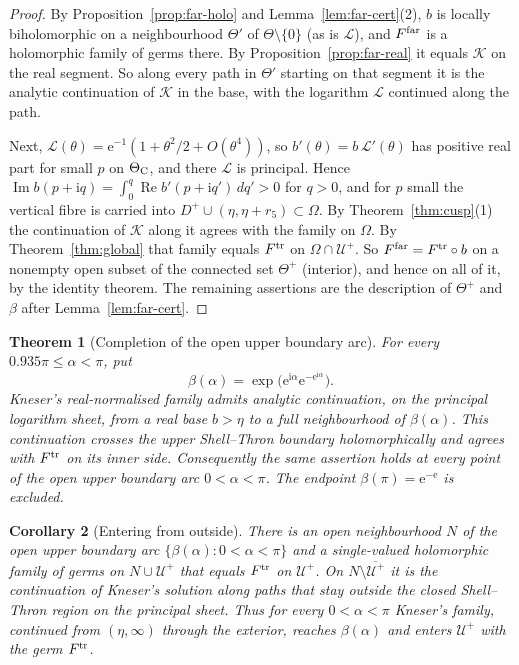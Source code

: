 \documentclass[11pt]{amsart}
\newtheorem{theorem}{Theorem}[section]
\newtheorem{corollary}[theorem]{Corollary}
\theoremstyle{definition}
\newcommand{\eee}{\mathrm{e}}
\newcommand{\ii}{\mathrm{i}}
\begin{document}
\begin{proof}
By Proposition~\ref{prop:far-holo} and Lemma~\ref{lem:far-cert}(2), $b$ is locally
biholomorphic on a neighbourhood $\Theta'$ of $\Theta\setminus\{0\}$ (as is $\mathcal L$), and $F^{\rm far}$ is a
holomorphic family of germs there.  By Proposition~\ref{prop:far-real} it equals $\mathcal K$ on
the real segment.  So along every path in $\Theta'$ starting on that segment it is the
analytic continuation of $\mathcal K$ in the base, with the logarithm $\mathcal L$ continued along
the path.

Next, $\mathcal L(\theta)=\eee^{-1}(1+\theta^2/2+O(\theta^4))$, so $b'(\theta)=b\,\mathcal L'(\theta)$ has positive real part for
small $p$ on $\Theta_{\rm C}$, and there $\mathcal L$ is principal.  Hence $\operatorname{Im}b(p+\ii q)=\int_0^q\operatorname{Re}b'(p+\ii q')\,dq'>0$ for $q>0$, and for $p$
small the vertical fibre is carried into $D^+\cup(\eta,\eta+r_5)\subset\Omega$.  By
Theorem~\ref{thm:cusp}(1) the continuation of $\mathcal K$ along it agrees with the family
on $\Omega$.  By Theorem~\ref{thm:global} that family equals $F^{\rm tr}$ on $\Omega\cap\mathcal U^+$.  So
$F^{\rm far}=F^{\rm tr}\circ b$ on a nonempty open subset of the connected set $\Theta^+$ (interior), and
hence on all of it, by the identity theorem.  The remaining assertions are the
description of $\Theta^+$ and $\beta$ after Lemma~\ref{lem:far-cert}.
\end{proof}

\begin{theorem}[Completion of the open upper boundary arc]\label{thm:last-arc}
For every $0.935\pi\le\alpha<\pi$, put
\[
 \beta(\alpha)=\exp\!\bigl(\eee^{\ii\alpha}
                         \eee^{-\eee^{\ii\alpha}}\bigr).
\]
Kneser's real-normalised family admits analytic continuation, on the principal
logarithm sheet, from a real base $b>\eta$ to a full neighbourhood of
$\beta(\alpha)$.  This continuation crosses the upper Shell--Thron boundary
holomorphically and agrees with $F^{\rm tr}$ on its inner side.  Consequently
the same assertion holds at every point of the open upper boundary arc
$0<\alpha<\pi$.  The endpoint $\beta(\pi)=\eee^{-\eee}$ is excluded.
\end{theorem}

\begin{corollary}[Entering from outside]\label{cor:band}
There is an open neighbourhood $N$ of the open upper boundary arc
$\{\beta(\alpha):0<\alpha<\pi\}$ and a single-valued holomorphic family of germs on
$N\cup\mathcal U^+$ that equals $F^{\rm tr}$ on $\mathcal U^+$.  On $N\setminus\overline{\mathcal U^+}$ it is the
continuation of Kneser's solution along paths that stay outside the closed
Shell--Thron region on the principal sheet.  Thus for every $0<\alpha<\pi$ Kneser's
family, continued from $(\eta,\infty)$ through the exterior, reaches $\beta(\alpha)$ and
enters $\mathcal U^+$ with the germ $F^{\rm tr}$.
\end{corollary}
\end{document}
